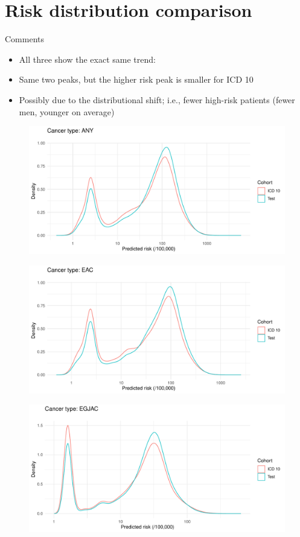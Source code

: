 \documentclass[english]{article}
\begin{document}
\newpage
\clearpage
\section{Risk distribution comparison}

Comments
\begin{itemize}
	\item All three show the exact same trend:
	\item Same two peaks, but the higher risk peak is smaller for ICD 10
	\item Possibly due to the distributional shift; i.e., fewer high-risk patients 
	(fewer men, younger on average)
\end{itemize}

\begin{figure}[h]
\centering
\includegraphics[width=\linewidth]{icd10/score_dist_ANY.pdf}
\end{figure}
\begin{figure}[h]
\centering
\includegraphics[width=\linewidth]{icd10/score_dist_EAC.pdf}
\end{figure}
\begin{figure}[h]
\centering
\includegraphics[width=\linewidth]{icd10/score_dist_EGJAC.pdf}
\end{figure}
\end{document}
